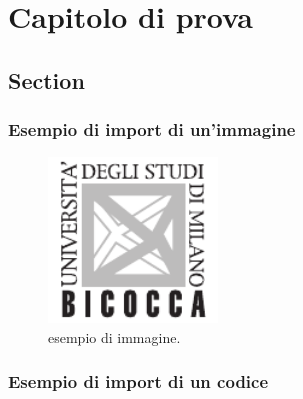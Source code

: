 \chapter{Capitolo di prova}
\section{Section}
\subsection{Esempio di import di un'immagine}

\begin{figure}[h]
    \centering
    \includegraphics[width=0.4\textwidth]{assets/images/logo_unimib.pdf}
    \caption{esempio di immagine.}
    \label{fig:logo_unimib}
\end{figure}


\subsection{Esempio di import di un codice}

